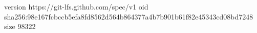 version https://git-lfs.github.com/spec/v1
oid sha256:98e167fcbccb5efa8fd8562d564b864377a4b7b901b61f82e45343cd08bd7248
size 98322
